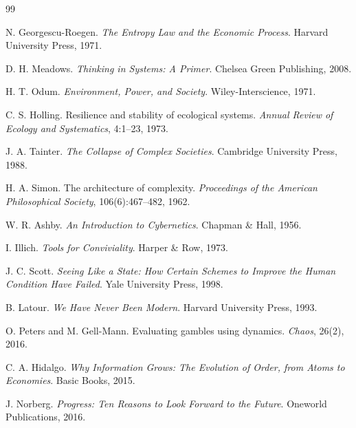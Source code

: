 \documentclass[12pt]{article} \usepackage[margin=1in]{geometry} \usepackage{setspace} \usepackage{amsmath,amssymb} \usepackage{hyperref}
\begin{document}
\begin{thebibliography}{99}

N. Georgescu-Roegen.
\newblock \emph{The Entropy Law and the Economic Process}.
\newblock Harvard University Press, 1971.

D. H. Meadows.
\newblock \emph{Thinking in Systems: A Primer}.
\newblock Chelsea Green Publishing, 2008.

H. T. Odum.
\newblock \emph{Environment, Power, and Society}.
\newblock Wiley-Interscience, 1971.

C. S. Holling.
\newblock Resilience and stability of ecological systems.
\newblock \emph{Annual Review of Ecology and Systematics}, 4:1--23, 1973.

J. A. Tainter.
\newblock \emph{The Collapse of Complex Societies}.
\newblock Cambridge University Press, 1988.

H. A. Simon.
\newblock The architecture of complexity.
\newblock \emph{Proceedings of the American Philosophical Society}, 106(6):467--482, 1962.

W. R. Ashby.
\newblock \emph{An Introduction to Cybernetics}.
\newblock Chapman \& Hall, 1956.

I. Illich.
\newblock \emph{Tools for Conviviality}.
\newblock Harper \& Row, 1973.

J. C. Scott.
\newblock \emph{Seeing Like a State: How Certain Schemes to Improve the Human Condition Have Failed}.
\newblock Yale University Press, 1998.

B. Latour.
\newblock \emph{We Have Never Been Modern}.
\newblock Harvard University Press, 1993.

O. Peters and M. Gell-Mann.
\newblock Evaluating gambles using dynamics.
\newblock \emph{Chaos}, 26(2), 2016.

C. A. Hidalgo.
\newblock \emph{Why Information Grows: The Evolution of Order, from Atoms to Economies}.
\newblock Basic Books, 2015.

J. Norberg.
\newblock \emph{Progress: Ten Reasons to Look Forward to the Future}.
\newblock Oneworld Publications, 2016.

\end{thebibliography}
\end{document}
